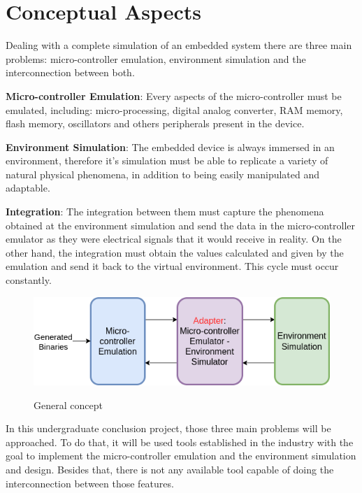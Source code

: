 \documentclass[../monografia.tex]{subfiles}
\begin{document}
\part{Conceptual Aspects}

Dealing with a complete simulation of an embedded system there are three main problems: micro-controller emulation, environment simulation and the interconnection between both.

\textbf{Micro-controller Emulation}: Every aspects of the micro-controller must be emulated, including: micro-processing, digital analog converter, RAM memory, flash memory, oscillators  and others peripherals present in the device.

\textbf{Environment Simulation}: The embedded device is always immersed in an environment, therefore it's simulation must be able to replicate a variety of natural physical phenomena, in addition to being easily manipulated and adaptable.

\textbf{Integration}: The integration between them must capture the phenomena obtained at the environment simulation and send the data in the micro-controller emulator as they were electrical signals that it would receive in reality. On the other hand, the integration must obtain the values calculated and given by the emulation and send it back to the virtual environment. This cycle must occur constantly.

\begin{figure}[h]
\centering
    \caption{General concept}
    \centering %
    \includegraphics[width=14cm]{General concept.png}
    \label{fig: General concept}
\end{figure}

In this undergraduate conclusion project, those three main problems will be approached. To do that, it will be used tools established in the industry with the goal to implement the micro-controller emulation and the environment simulation and design. Besides that, there is not any available tool capable of doing the interconnection between those features. 
\end{document}
